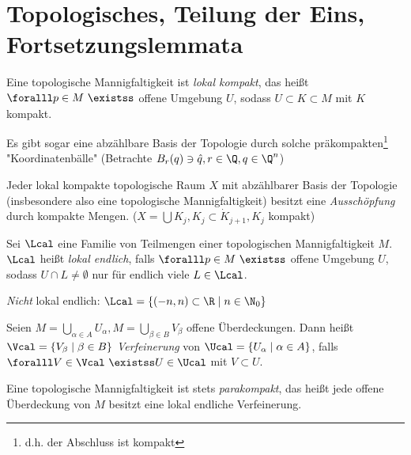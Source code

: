 \chapter{Topologisches, Teilung der Eins, Fortsetzungslemmata}
\lecture

\begin{lem}
	Eine topologische Mannigfaltigkeit ist \emph{lokal kompakt}, das heißt $ \foralll p \in  M \ \existss $ offene Umgebung $U$, sodass $ U \subset K \subset M$ mit $K$ kompakt.
\end{lem}

\begin{rem}\label{5.2}
	Es gibt sogar eine abzählbare Basis der Topologie durch solche präkompakten\footnote{d.h. der Abschluss ist kompakt}  "Koordinatenbälle" (Betrachte $ B_r(q) \ni \hat{q}, r \in \Q, q \in \Q^n $)
\end{rem}

\begin{lem}
	Jeder lokal kompakte topologische Raum $X$ mit abzählbarer Basis der Topologie (insbesondere also eine topologische Mannigfaltigkeit) besitzt eine \emph{Ausschöpfung} durch kompakte Mengen. ($X = \bigcup K_j, K_j \subset \dot{K}_{j+1}, K_j$ kompakt)
\end{lem}

\begin{defn*}
	Sei $\Lcal$ eine Familie von Teilmengen einer topologischen Mannigfaltigkeit $M$. $\Lcal$ heißt \emph{lokal endlich}, falls $ \foralll p \in M \ \existss $ offene Umgebung $U$, sodass $ U \cap L \neq \emptyset $ nur für endlich viele $L \in \Lcal$.
\end{defn*}

\emph{Nicht} lokal endlich: $ \Lcal = \{(-n,n) \subset \R \mid n \in \N_0\} $

\begin{defn*}[Verfeinerung]
	Seien $ M = \bigcup_{\alpha \in A} U_\alpha, M = \bigcup_{\beta \in B} V_\beta $ offene Überdeckungen. Dann heißt $ \Vcal = \{V_\beta \mid \beta \in B\} $ \emph{Verfeinerung} von $ \Ucal = \{U_\alpha \mid \alpha \in A\} $, falls $ \foralll V \in \Vcal \ \existss U \in \Ucal $ mit $ V \subset U $.
\end{defn*}

\begin{thm}
	Eine topologische Mannigfaltigkeit ist stets \emph{parakompakt}, das heißt jede offene Überdeckung von $M$ besitzt eine lokal endliche Verfeinerung.
\end{thm}

